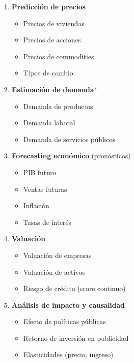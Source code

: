 \documentclass[
  doc,
  floatsintext,
  longtable,
  a4paper,
  nolmodern,
  notxfonts,
  notimes,
  12pt,
  colorlinks=true,linkcolor=blue,citecolor=blue,urlcolor=blue]{apa7}
\providecommand{\tightlist}{%
  \setlength{\itemsep}{0pt}\setlength{\parskip}{0pt}}
\begin{document}
\begin{enumerate}
\def\labelenumi{\arabic{enumi}.}
\item
  \textbf{Predicción de precios}

  \begin{itemize}
  \tightlist
  \item
    Precios de viviendas
  \item
    Precios de acciones
  \item
    Precios de commodities
  \item
    Tipos de cambio
  \end{itemize}
\item
  \textbf{Estimación de demanda}*

  \begin{itemize}
  \tightlist
  \item
    Demanda de productos
  \item
    Demanda laboral
  \item
    Demanda de servicios públicos
  \end{itemize}
\item
  \textbf{Forecasting económico} (pronósticos)

  \begin{itemize}
  \tightlist
  \item
    PIB futuro
  \item
    Ventas futuras
  \item
    Inflación
  \item
    Tasas de interés
  \end{itemize}
\item
  \textbf{Valuación}

  \begin{itemize}
  \tightlist
  \item
    Valuación de empresas
  \item
    Valuación de activos
  \item
    Riesgo de crédito (score continuo)
  \end{itemize}
\item
  \textbf{Análisis de impacto y causalidad}

  \begin{itemize}
  \tightlist
  \item
    Efecto de políticas públicas
  \item
    Retorno de inversión en publicidad
  \item
    Elasticidades (precio, ingreso)
  \end{itemize}
\end{enumerate}
\end{document}
